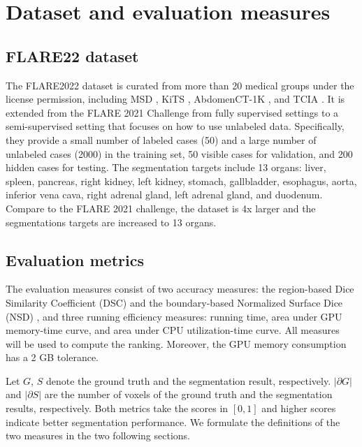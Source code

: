 

\section{Dataset and evaluation measures}

\subsection{FLARE22 dataset}

The FLARE2022 dataset is curated from more than 20 medical groups under the license permission, including MSD \cite{simpson2019MSD}, KiTS \cite{KiTS,KiTSDataset}, AbdomenCT-1K \cite{AbdomenCT-1K}, and TCIA \cite{clark2013TCIA}. 
It is extended from the FLARE 2021 Challenge from fully supervised settings to a semi-supervised setting that focuses on how to use unlabeled data. Specifically, they provide a small number of labeled cases (50) and a large number of unlabeled cases (2000) in the training set, 50 visible cases for validation, and 200 hidden cases for testing. The segmentation targets include 13 organs: liver, spleen, pancreas, right kidney, left kidney, stomach, gallbladder, esophagus, aorta, inferior vena cava, right adrenal gland, left adrenal gland, and duodenum. Compare to the FLARE 2021 challenge, the dataset is 4x larger and the segmentations targets are increased to 13 organs.

\subsection{Evaluation metrics}

The evaluation measures consist of two accuracy measures: the region-based Dice Similarity Coefficient (DSC) and the boundary-based Normalized Surface Dice (NSD) \cite{nikolov2018deep}, and three running efficiency measures: running time, area under GPU memory-time curve, and area under CPU utilization-time curve. All measures will be used to compute the ranking. Moreover, the GPU memory consumption has a 2 GB tolerance.

Let $G$, $S$ denote the ground truth and the segmentation result, respectively. $|\partial G|$ and $|\partial S|$ are the number of voxels of the ground truth and the segmentation results, respectively. Both metrics take the scores in $[0, 1]$ and higher
scores indicate better segmentation performance. We formulate the definitions of the two measures in the two following sections.

